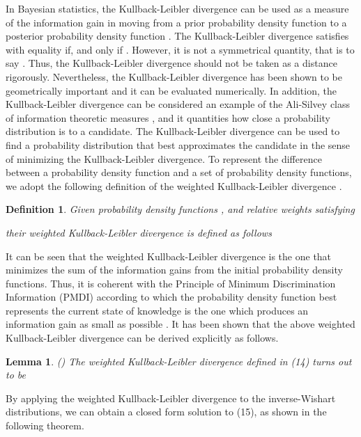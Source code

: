 \documentclass[12pt,draftcls,onecolumn]{IEEEtran}
\newtheorem{definition}{Definition}
\newtheorem{lemma}{Lemma}
\begin{document}
In Bayesian statistics, the Kullback-Leibler divergence can be used
as a measure of the information gain in moving from a prior
probability density function  to a posterior probability
density function . The Kullback-Leibler divergence satisfies
 with equality if, and only if
. However, it is not a symmetrical quantity, that is to
say  \cite{prml}. Thus, the
Kullback-Leibler divergence should not be taken as a distance
rigorously. Nevertheless, the Kullback-Leibler divergence has been
shown to be geometrically important and it can be evaluated
numerically. In addition, the Kullback-Leibler divergence can be
considered an example of the Ali-Silvey class of information
theoretic measures \cite{alisil}, and it quantities how close a
probability distribution is to a candidate. The Kullback-Leibler
divergence can be used to find a probability distribution that best
approximates the candidate in the sense of minimizing the
Kullback-Leibler divergence. To represent the difference between a
probability density function and a set of probability density
functions, we adopt the following definition of the weighted
Kullback-Leibler divergence \cite{2014kld}.


\begin{definition}
Given  probability density functions , and
relative weights  satisfying

their weighted Kullback-Leibler divergence is defined as follows

\end{definition}


It can be seen that the weighted Kullback-Leibler divergence
 is the one that minimizes the sum of the information
gains from the initial probability density functions. Thus, it is
coherent with the Principle of Minimum Discrimination Information
(PMDI) according to which the probability density function best
represents the current state of knowledge is the one which produces
an information gain as small as possible \cite{it}. It has been
shown that the above weighted Kullback-Leibler divergence can be
derived explicitly as follows.
\begin{lemma}(\cite{2014kld})
The weighted Kullback-Leibler divergence defined in (14) turns out
to be

\end{lemma}



By applying the weighted Kullback-Leibler divergence to the
inverse-Wishart distributions, we can obtain a closed form solution
to (15), as shown in the following theorem.
\end{document}
